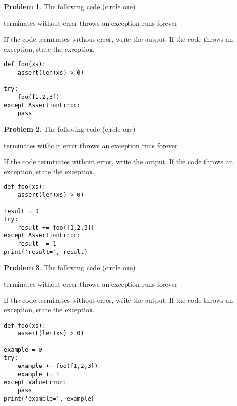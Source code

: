 \documentclass[10pt]{article}
\theoremstyle{definition}
\newtheorem{problem}{Problem}
\begin{document}
\begin{problem}
    The following code (circle one)

    \vspace{0.25in}
    \hspace{0.5in}terminates without error 
    \hspace{1in}throws an exception
    \hspace{1in}runs forever
    \vspace{0.25in}

    \noindent
    If the code terminates without error, write the output.
    If the code throws an exception, state the exception.
\end{problem}
\begin{lstlisting}
def foo(xs):
    assert(len(xs) > 0)

try:
    foo([1,2,3])
except AssertionError:
    pass
\end{lstlisting}
\vspace{0.5in}

\begin{problem}
    The following code (circle one)

    \vspace{0.25in}
    \hspace{0.5in}terminates without error 
    \hspace{1in}throws an exception
    \hspace{1in}runs forever
    \vspace{0.25in}

    \noindent
    If the code terminates without error, write the output.
    If the code throws an exception, state the exception.
\end{problem}
\begin{lstlisting}
def foo(xs):
    assert(len(xs) > 0)

result = 0
try:
    result += foo([1,2,3])
except AssertionError:
    result -= 1
print('result=', result)
\end{lstlisting}
\vspace{0.5in}

\begin{problem}
    The following code (circle one)

    \vspace{0.25in}
    \hspace{0.5in}terminates without error 
    \hspace{1in}throws an exception
    \hspace{1in}runs forever
    \vspace{0.25in}

    \noindent
    If the code terminates without error, write the output.
    If the code throws an exception, state the exception.
\end{problem}
\begin{lstlisting}
def foo(xs):
    assert(len(xs) > 0)

example = 0
try:
    example += foo([1,2,3])
    example += 1
except ValueError:
    pass
print('example=', example)
\end{lstlisting}
\vspace{0.75in}
\end{document}

